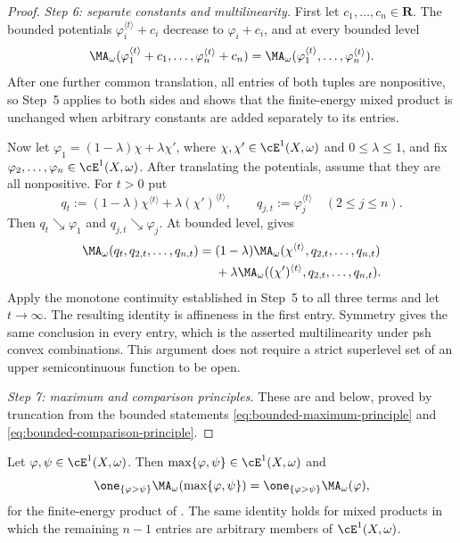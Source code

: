 \begin{proof}
\emph{Step 6: separate constants and multilinearity.}  First let
\(c_1,\ldots,c_n\in\mathbf R\).  The bounded potentials
\(\varphi_i^{\langle t\rangle}+c_i\) decrease to \(\varphi_i+c_i\), and
at every bounded level
\[
\MA_\omega(\varphi_1^{\langle t\rangle}+c_1,\ldots,
                  \varphi_n^{\langle t\rangle}+c_n)
 =\MA_\omega(\varphi_1^{\langle t\rangle},\ldots,
                  \varphi_n^{\langle t\rangle}).
\]
After one further common translation, all entries of both tuples are
nonpositive, so Step~5 applies to both sides and shows that the
finite-energy mixed product is unchanged when arbitrary constants are added
separately to its entries.

Now let
\(\varphi_1=(1-\lambda)\chi+\lambda\chi'\), where
\(\chi,\chi'\in\cE^1(X,\omega)\) and \(0\leq\lambda\leq1\), and fix
\(\varphi_2,\ldots,\varphi_n\in\cE^1(X,\omega)\).  After translating the
potentials, assume that they are all nonpositive.  For \(t>0\) put
\[
 q_t:=(1-\lambda)\chi^{\langle t\rangle}
             +\lambda(\chi')^{\langle t\rangle},
 \qquad
 q_{j,t}:=\varphi_j^{\langle t\rangle}\quad(2\leq j\leq n).
\]
Then \(q_t\searrow\varphi_1\) and
\(q_{j,t}\searrow\varphi_j\).  At bounded level,
 gives
\[
 \begin{aligned}
 \MA_\omega(q_t,q_{2,t},\ldots,q_{n,t})
  ={}&(1-\lambda)
     \MA_\omega(\chi^{\langle t\rangle},q_{2,t},\ldots,q_{n,t})\\
   &+\lambda
     \MA_\omega((\chi')^{\langle t\rangle},q_{2,t},\ldots,q_{n,t}).
 \end{aligned}
\]
Apply the monotone continuity established in Step~5 to all three terms and
let \(t\to\infty\).  The resulting identity is affineness in the first
entry.  Symmetry gives the same conclusion in every entry, which is the
asserted multilinearity under psh convex combinations.  This argument does
not require a strict superlevel set of an upper semicontinuous function to
be open.

\emph{Step 7: maximum and comparison principles.}  These are
 and
 below, proved by truncation from the bounded
statements \eqref{eq:bounded-maximum-principle} and
\eqref{eq:bounded-comparison-principle}.
\end{proof}

\begin{theorem}
\label{thm:ch26-e1-maximum-principle}
Let \(\varphi,\psi\in\cE^1(X,\omega)\).  Then
\(\max\{\varphi,\psi\}\in\cE^1(X,\omega)\) and
\begin{equation}
\label{eq:ch26-e1-maximum-principle}
 \one_{\{\varphi>\psi\}}\MA_\omega(\max\{\varphi,\psi\})
 =\one_{\{\varphi>\psi\}}\MA_\omega(\varphi),
\end{equation}
for the finite-energy product of .  The same
identity holds for mixed products in which the remaining \(n-1\) entries are
arbitrary members of \(\cE^1(X,\omega)\).
\end{theorem}


